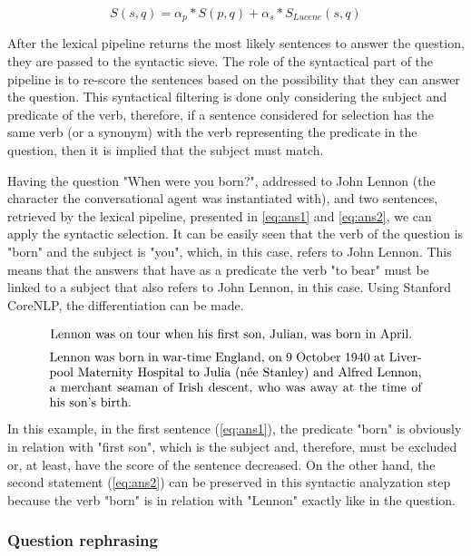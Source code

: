 \begin{equation}
  S(s, q) = \alpha_{p} * S(p, q) + \alpha_{s} * S_{Lucene}(s, q)
  \label{eq:score}
\end{equation}

After the lexical pipeline returns the most likely sentences to answer the question, they are passed to the syntactic sieve. The role of the syntactical part of the pipeline is to re-score the sentences based on the possibility that they can answer the question. This syntactical filtering is done only considering the subject and predicate of the verb, therefore, if a sentence considered for selection has the same verb (or a synonym) with the verb representing the predicate in the question, then it is implied that the subject must match.

Having the question "When were you born?", addressed to John Lennon (the character the conversational agent was instantiated with), and two sentences, retrieved by the lexical pipeline, presented in \ref{eq:ans1} and \ref{eq:ans2}, we can apply the syntactic selection. It can be easily seen that the verb of the question is "born" and the subject is "you", which, in this case, refers to John Lennon. This means that the answers that have as a predicate the verb "to bear" must be linked to a subject that also refers to John Lennon, in this case. Using Stanford CoreNLP, the differentiation can be made.

\begin{equation}
  \text{\parbox{.85\textwidth}{Lennon was on tour when his first son, Julian, was born in April.}}
  \label{eq:ans1}
\end{equation}
\begin{equation}
  \text{\parbox{.85\textwidth}{Lennon was born in war-time England, on 9 October 1940 at Liverpool Maternity Hospital to Julia (née Stanley) and Alfred Lennon, a merchant seaman of Irish descent, who was away at the time of his son's birth.}}
  \label{eq:ans2}
\end{equation}

In this example, in the first sentence (\ref{eq:ans1}), the predicate "born" is obviously in relation with "first son", which is the subject and, therefore, must be excluded or, at least, have the score of the sentence decreased. On the other hand, the second statement (\ref{eq:ans2}) can be preserved in this syntactic analyzation step because the verb "born" is in relation with "Lennon" exactly like in the question.

\subsubsection{Question rephrasing}
\label{sub-sub-sec:rephrasing}

